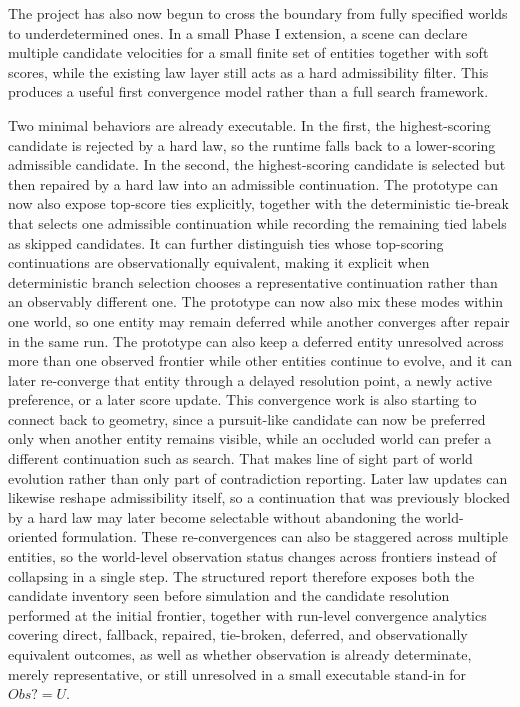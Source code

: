 The project has also now begun to cross the boundary from fully specified worlds to underdetermined ones.
In a small Phase I extension, a scene can declare multiple candidate velocities for a small finite set of entities together with soft scores, while the existing law layer still acts as a hard admissibility filter.
This produces a useful first convergence model rather than a full search framework.

Two minimal behaviors are already executable.
In the first, the highest-scoring candidate is rejected by a hard law, so the runtime falls back to a lower-scoring admissible candidate.
In the second, the highest-scoring candidate is selected but then repaired by a hard law into an admissible continuation.
The prototype can now also expose top-score ties explicitly, together with the deterministic tie-break that selects one admissible continuation while recording the remaining tied labels as skipped candidates.
It can further distinguish ties whose top-scoring continuations are observationally equivalent, making it explicit when deterministic branch selection chooses a representative continuation rather than an observably different one.
The prototype can now also mix these modes within one world, so one entity may remain deferred while another converges after repair in the same run.
The prototype can also keep a deferred entity unresolved across more than one observed frontier while other entities continue to evolve, and it can later re-converge that entity through a delayed resolution point, a newly active preference, or a later score update.
This convergence work is also starting to connect back to geometry, since a pursuit-like candidate can now be preferred only when another entity remains visible, while an occluded world can prefer a different continuation such as search. That makes line of sight part of world evolution rather than only part of contradiction reporting.
Later law updates can likewise reshape admissibility itself, so a continuation that was previously blocked by a hard law may later become selectable without abandoning the world-oriented formulation.
These re-convergences can also be staggered across multiple entities, so the world-level observation status changes across frontiers instead of collapsing in a single step.
The structured report therefore exposes both the candidate inventory seen before simulation and the candidate resolution performed at the initial frontier, together with run-level convergence analytics covering direct, fallback, repaired, tie-broken, deferred, and observationally equivalent outcomes, as well as whether observation is already determinate, merely representative, or still unresolved in a small executable stand-in for $Obs? = U$.

